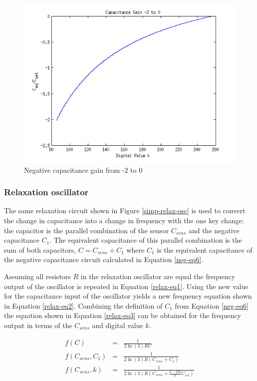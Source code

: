 \begin{figure}
	\begin{center}
		\includegraphics[width=.6\textwidth]{Images/neg-cap-gain-2.png}
		\caption{Negative capacitance gain from -2 to 0\label{neg-fig2}}
	\end{center}
\end{figure}

\subsubsection{Relaxation oscillator}
The same relaxation circuit shown in Figure \ref{simp-relax-osc} is used to convert the change in capacitance into a change in frequency with the one key change: the capacitor is the parallel combination of the sensor $C_{sens}$ and the negative capacitance $C_{1}$.  The equivalent capacitance of this parallel combination is the sum of both capacitors, $C=C_{sens}+C_1$ where $C_1$ is the equivalent capacitance of the negative capacitance circuit calculated in Equation \ref{neg-eq6}. 

Assuming all resistors $R$ in the relaxation oscillator are equal the frequency output of the oscillator is repeated in Equation \ref{relax-eq1}.  Using the new value for the capacitance input of the oscillator yields a new frequency equation shown in Equation \ref{relax-eq2}.  Combining the definition of $C_1$ from Equation \ref{neg-eq6} the equation shown in Equation \ref{relax-eq3} can be obtained for the frequency output in terms of the $C_{sens}$ and digital value $k$.

\begin{eqnarray}
	f(C)&=&\frac{1}{2\ln(3)RC}\label{relax-eq1}\\
	f(C_{sens},C_1)&=&\frac{1}{2\ln(3)R(C_{sens}+C_1)}\label{relax-eq2}\\
	f(C_{sens},k)&=&\frac{1}{2\ln(3)R(C_{sens}+\frac{k-256}{k}C_{set})}\label{relax-eq3}
\end{eqnarray}


